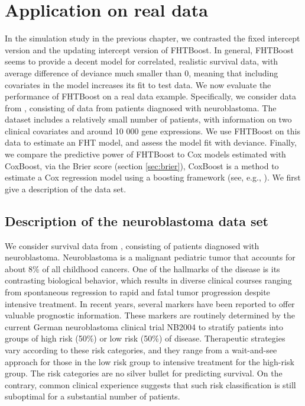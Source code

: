 \chapter{Application on real data}
In the simulation study in the previous chapter, we contrasted the fixed intercept version and the updating intercept version of FHTBoost.
In general, FHTBoost seems to provide a decent model for correlated, realistic survival data, with average difference of deviance much smaller than 0, meaning that including covariates in the model increases its fit to test data.
We now evaluate the performance of FHTBoost on a real data example.
Specifically, we consider data from \citet{oberthuer-data}, consisting of data from patients diagnosed with neuroblastoma.
The dataset includes a relatively small number of patients, with information on two clinical covariates and around 10 000 gene expressions.
We use FHTBoost on this data to estimate an FHT model, and assess the model fit with deviance.
Finally, we compare the predictive power of FHTBoost to Cox models estimated with CoxBoost, via the Brier score (section \ref{sec:brier}), CoxBoost is a method to estimate a Cox regression model using a boosting framework (see, e.g., \citet{BinderSchumacher2008}).
We first give a description of the data set.

\section{Description of the neuroblastoma data set}
We consider survival data from \citet{oberthuer-data}, consisting of patients diagnosed with neuroblastoma.
Neuroblastoma is a malignant pediatric tumor that accounts for about 8\% of all childhood cancers.
One of the hallmarks of the disease is its contrasting biological behavior, which results in diverse clinical courses ranging from spontaneous regression to rapid and fatal tumor progression despite intensive treatment.
In recent years, several markers have been reported to offer valuable prognostic information.
These markers are routinely determined by the current German neuroblastoma clinical trial NB2004 to stratify patients into groups of high risk (50\%) or low risk (50\%) of disease.
Therapeutic strategies vary according to these risk categories, and they range from a wait-and-see approach for those in the low risk group
to intensive treatment for the high-risk group.
The risk categories are no silver bullet for predicting survival.
On the contrary, common clinical experience suggests that such risk classification is still suboptimal for a substantial number of patients.

